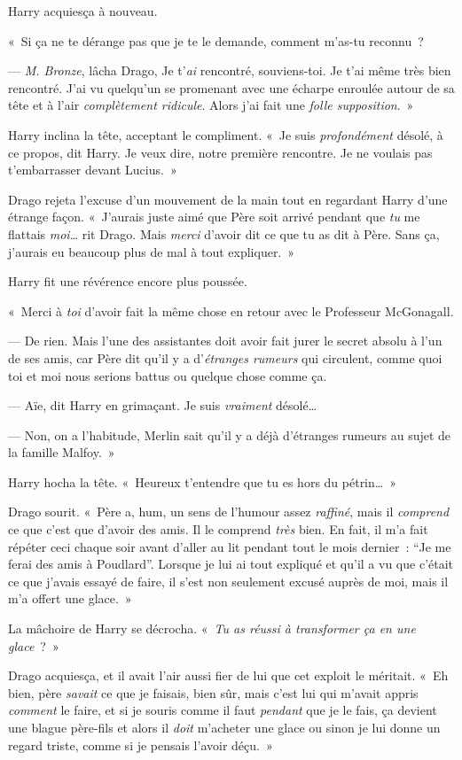 Harry acquiesça à nouveau.

«~Si ça ne te dérange pas que je te le demande, comment m'as-tu reconnu~?

--- \emph{M. Bronze}, lâcha Drago, Je t'\emph{ai} rencontré, souviens-toi. Je t'ai même très bien rencontré. J'ai vu quelqu'un se promenant avec une écharpe enroulée autour de sa tête et à l'air \emph{complètement ridicule}. Alors j'ai fait une \emph{folle supposition}.~»

Harry inclina la tête, acceptant le compliment. «~Je suis \emph{profondément} désolé, à ce propos, dit Harry. Je veux dire, notre première rencontre. Je ne voulais pas t'embarrasser devant Lucius.~»

Drago rejeta l'excuse d'un mouvement de la main tout en regardant Harry d'une étrange façon. «~J'aurais juste aimé que Père soit arrivé pendant que \emph{tu} me flattais \emph{moi}… rit Drago. Mais \emph{merci} d'avoir dit ce que tu as dit à Père. Sans ça, j'aurais eu beaucoup plus de mal à tout expliquer.~»

Harry fit une révérence encore plus poussée.

«~Merci à \emph{toi} d'avoir fait la même chose en retour avec le Professeur McGonagall.

--- De rien. Mais l'une des assistantes doit avoir fait jurer le secret absolu à l'un de ses amis, car Père dit qu'il y a d'\emph{étranges rumeurs} qui circulent, comme quoi toi et moi nous serions battus ou quelque chose comme ça.

--- Aïe, dit Harry en grimaçant. Je suis \emph{vraiment} désolé…

--- Non, on a l'habitude, Merlin sait qu'il y a déjà d'étranges rumeurs au sujet de la famille Malfoy.~»

Harry hocha la tête. «~Heureux t'entendre que tu es hors du pétrin…~»

Drago sourit. «~Père a, hum, un sens de l'humour assez \emph{raffiné}, mais il \emph{comprend} ce que c'est que d'avoir des amis. Il le comprend \emph{très} bien. En fait, il m'a fait répéter ceci chaque soir avant d'aller au lit pendant tout le mois dernier~: “Je me ferai des amis à Poudlard”. Lorsque je lui ai tout expliqué et qu'il a vu que c'était ce que j'avais essayé de faire, il s'est non seulement excusé auprès de moi, mais il m'a offert une glace.~»

La mâchoire de Harry se décrocha. «~\emph{Tu as réussi à transformer ça en une glace}~?~»

Drago acquiesça, et il avait l'air aussi fier de lui que cet exploit le méritait. «~Eh bien, père \emph{savait} ce que je faisais, bien sûr, mais c'est lui qui m'avait appris \emph{comment} le faire, et si je souris comme il faut \emph{pendant} que je le fais, ça devient une blague père-fils et alors il \emph{doit} m'acheter une glace ou sinon je lui donne un regard triste, comme si je pensais l'avoir déçu.~»

